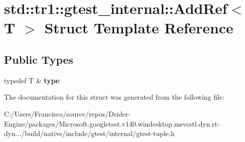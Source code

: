 \hypertarget{structstd_1_1tr1_1_1gtest__internal_1_1_add_ref}{}\section{std\+:\+:tr1\+:\+:gtest\+\_\+internal\+:\+:Add\+Ref$<$ T $>$ Struct Template Reference}
\label{structstd_1_1tr1_1_1gtest__internal_1_1_add_ref}
\subsection*{Public Types}
\begin{DoxyCompactItemize}
\item 
\mbox{\label{structstd_1_1tr1_1_1gtest__internal_1_1_add_ref_a1e5616e414125574c1653e3a1fc68491}} 
typedef T \& {\bfseries type}
\end{DoxyCompactItemize}


The documentation for this struct was generated from the following file\+:\begin{DoxyCompactItemize}
\item 
C\+:/\+Users/\+Francisco/source/repos/\+Drider-\/\+Engine/packages/\+Microsoft.\+googletest.\+v140.\+windesktop.\+msvcstl.\+dyn.\+rt-\/dyn.../build/native/include/gtest/internal/gtest-\/tuple.\+h\end{DoxyCompactItemize}
